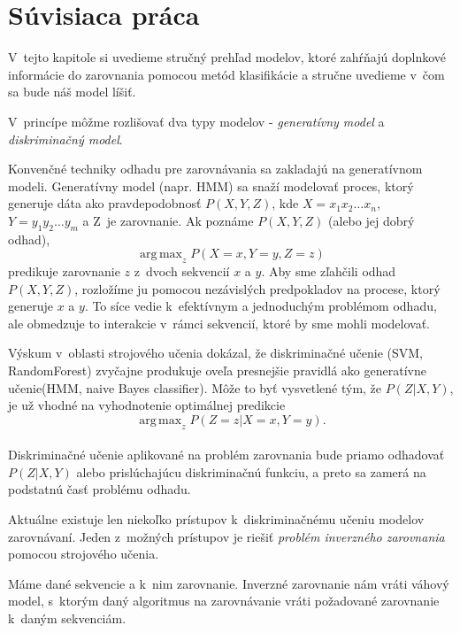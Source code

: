 \chapter{Súvisiaca práca}

V~tejto kapitole si uvedieme stručný prehľad modelov, ktoré zahŕňajú doplnkové informácie do zarovnania pomocou metód klasifikácie a stručne uvedieme v~čom sa bude náš model líšiť.

V~princípe môžme rozlišovať dva typy modelov - \textit{generatívny model} a \textit{diskriminačný model}.

Konvenčné techniky odhadu pre zarovnávania sa zakladajú na generatívnom modeli. Generatívny model (napr. HMM) sa snaží modelovať proces, ktorý generuje dáta ako pravdepodobnosť $P(X,Y,Z)$, kde $X = x_1x_2\dots x_n$, $Y = y_1y_2\dots y_m$ a Z~je zarovnanie. Ak poznáme $P(X,Y,Z)$ (alebo jej dobrý odhad),
$$\operatorname{ arg\,max}_z P(X = x,Y = y,Z = z)$$
predikuje zarovnanie $z$ z~dvoch sekvencií $x$ a $y$. Aby sme zľahčili odhad $P(X,Y,Z)$, rozložíme ju pomocou nezávislých predpokladov na procese, ktorý generuje $x$ a $y$. To síce vedie k~efektívnym a jednoduchým problémom odhadu, ale obmedzuje to interakcie v~rámci sekvencií, ktoré by sme mohli modelovať. \cite{svmTrainingProteinsAlignment}

Výskum v~oblasti strojového učenia dokázal, že diskriminačné učenie (SVM, RandomForest) zvyčajne produkuje oveľa presnejšie pravidlá ako generatívne učenie(HMM, naive Bayes classifier). \cite{svmTrainingProteinsAlignment}
Môže to byť vysvetlené tým, že $P(Z|X,Y)$, je už vhodné na vyhodnotenie optimálnej predikcie
$$\operatorname{ arg\,max}_z P(Z = z|X = x,Y = y).$$
\cite{svmTrainingProteinsAlignment}\\
Diskriminačné učenie aplikované na problém zarovnania bude priamo odhadovať $P(Z|X,Y)$ alebo prislúchajúcu diskriminačnú funkciu, a preto sa zamerá na podstatnú časť problému odhadu. \cite{svmTrainingProteinsAlignment}

Aktuálne existuje len niekoľko prístupov k~diskriminačnému učeniu modelov zarovnávaní.
Jeden z~možných prístupov je riešiť \textit{problém inverzného zarovnania} pomocou strojového učenia. \cite{svmTrainingProteinsAlignment}

\begin{df}
Máme dané sekvencie a k~nim zarovnanie. Inverzné zarovnanie nám vráti váhový model, s~ktorým daný algoritmus na zarovnávanie vráti požadované zarovnanie k~daným sekvenciám.
\end{df}

